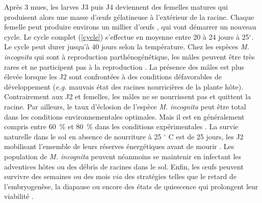 	 Après 3 mues, les larves J3 puis J4 deviennent des femelles matures qui  produisent alors une masse d’œufs gélatineuse à l'extérieur de la racine.
Chaque femelle peut produire environs un millier d’œufs \citep{Castagnone-Sereno2013}, qui vont démarrer un nouveau cycle.
Le cycle complet  (\autoref{cycle}) s’effectue en moyenne entre  20 à 24 jours à 25$^{\circ}$. Le cycle peut durer jusqu'à 40 jours selon la température.
Chez les espèces \textit{M. incognita} qui sont à reproduction  parthénogénétique, les mâles peuvent être très rares et ne participent pas à la reproduction \citep{Triantaphyllou1979}. La présence des mâles est plus élevée lorsque  les  J2 sont confrontées à des conditions défavorables de développement (\textit{e.g.} mauvais état des racines nourricières de la plante hôte). 
Contrairement aux J2 et femelles, les mâles ne se nourrissent pas et quittent la racine. Par ailleurs, le taux d’éclosion de l’espèce \textit{M. incognita} peut être total dans les conditions environnementales optimales. Mais il est en généralement  compris entre 60~\% et 80~\% dans les conditions expérimentales \citep{DeGuiran1979}. %
La survie naturelle  dans le sol en absence de nourriture à 25 $^\circ$ C est de 25 jours, les J2  mobilisant l’ensemble de leurs réserves énergétiques avant de mourir \citep{Tsai2008}.
Les population de \textit{M. incognita} peuvent néanmoins se maintenir en infectant
les adventices hôtes ou des débris de racines dans le sol.
Enfin, les œufs  peuvent survivre des semaines ou des  mois  $via$ des stratégies telles que le retard de l'embryogenèse, la diapause ou encore des états de quiescence qui prolongent leur viabilité \citep{Perry2009}. 


